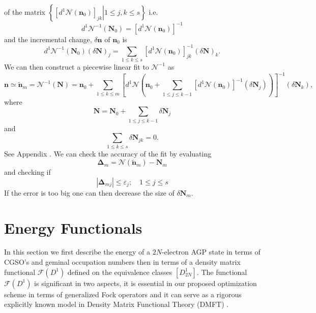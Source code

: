 \documentclass[aps,preprint]{revtex4}%
\begin{document}
of the matrix $\left\{  \left.  \left[  d^{1}\mathcal{N}\left(  \mathbf{n}%
_{0}\right)  \right]  _{jk}\right\vert 1\leq j,k\leq s\right\}  $ i.e.
\begin{equation}
d^{1}\mathcal{N}^{-1}\left(  \mathbf{N}_{0}\right)  =\left[  d^{1}%
\mathcal{N}\left(  \mathbf{n}_{0}\right)  \right]  ^{-1}%
\end{equation}
and the incremental change, $\delta\mathbf{n}$ of $\mathbf{n}_{0}$ is
\begin{equation}
d^{1}\mathcal{N}^{-1}\left(  \mathbf{N}_{0}\right)  \left(  \delta
\mathbf{N}\right)  _{j}=\sum_{1\leq k\leq s}\left[  d^{1}\mathcal{N}\left(
\mathbf{n}_{0}\right)  \right]  _{jk}^{-1}\left(  \delta\mathbf{N}\right)
_{k}.
\end{equation}
We can then construct a piecewise linear fit to $\mathcal{N}^{-1}$ as%
\begin{equation}
\mathbf{n}\simeq\mathbf{\tilde{n}}_{m}=\mathcal{N}^{-1}\left(  \mathbf{N}%
\right)  =\mathbf{n}_{0}+\sum_{1\leq k\leq m}\left[  d^{1}\mathcal{N}\left(
\mathbf{n}_{0}+\sum_{1\leq j\leq k-1}\left[  d^{1}\mathcal{N}\left(
\mathbf{n}_{0}\right)  \right]  ^{-1}\left(  \delta\mathbf{N}_{j}\right)
\right)  \right]  ^{-1}\left(  \delta\mathbf{N}_{k}\right)  ,
\end{equation}
where
\begin{equation}
\mathbf{N=N}_{0}+\sum_{1\leq j\leq k-1}\delta\mathbf{N}_{j}%
\end{equation}
and
\begin{equation}
\sum_{1\leq k\leq s}\delta\mathbf{N}_{jk}=0.
\end{equation}
See Appendix \label{linfit}. We can check the accuracy of the fit by
evaluating
\begin{equation}
\mathbf{\Delta}_{m}=\mathcal{N}\left(  \mathbf{\tilde{n}}_{m}\right)
-\mathbf{N}_{m}%
\end{equation}
and checking if
\begin{equation}
\left\vert \mathbf{\Delta}_{mj}\right\vert \leq\varepsilon_{j};\quad1\leq
j\leq s
\end{equation}
If the error is too big one can then decrease the size of $\delta
\mathbf{N}_{m}$.

\section{Energy Functionals \label{Energy}}

In this section we first describe the energy of a $2N$-electron AGP state in
terms of CGSO's and geminal occupation numbers then in terms of a density
matrix functional $\mathcal{F}\left(  D^{1}\right)  $ defined on the
equivalence classes $\left[  D_{2N}^{1}\right]  $. The functional
$\mathcal{F}\left(  D^{1}\right)  $ is significant in two aspects, it is
essential in our proposed optimization scheme in terms of generalized Fock
operators and it can serve as a rigorous explicitly known model in Density
Matrix Functional Theory (DMFT) \cite{DMFT}.
\end{document}
